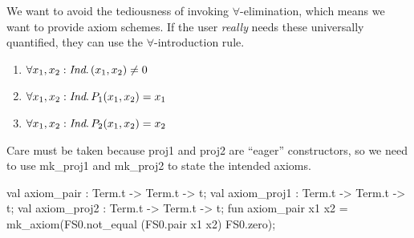 \begin{node}
We want to avoid the tediousness of invoking $\forall$-elimination,
which means we want to provide axiom schemes. If the user
\emph{really} needs these universally quantified, they can use the
$\forall$-introduction rule.
\begin{enumerate}
  \item $\forall x_{1},x_{2}:\textit{Ind}\ldotp (x_{1},x_{2})\neq0$
  \item $\forall x_{1},x_{2}:\textit{Ind}\ldotp P_{1}(x_{1},x_{2})=x_{1}$
  \item $\forall x_{1},x_{2}:\textit{Ind}\ldotp P_{2}(x_{1},x_{2})=x_{2}$
\end{enumerate}
Care must be taken because {\Tt{}proj1\nwendquote} and {\Tt{}proj2\nwendquote} are ``eager''
constructors, so we need to use {\Tt{}mk{\_}proj1\nwendquote} and {\Tt{}mk{\_}proj2\nwendquote} to state
the intended axioms.
\end{node}

\nwenddocs{}\endmoddef\nwstartdeflinemarkup{}\nwenddeflinemarkup
val axiom_pair : Term.t -> Term.t -> t;
val axiom_proj1 : Term.t -> Term.t -> t;
val axiom_proj2 : Term.t -> Term.t -> t;
\nwendcode{}\nwdocspar
\nwenddocs{}\endmoddef\nwstartdeflinemarkup{}\nwenddeflinemarkup
fun axiom_pair x1 x2 =
  mk_axiom(FS0.not_equal (FS0.pair x1 x2) FS0.zero);

